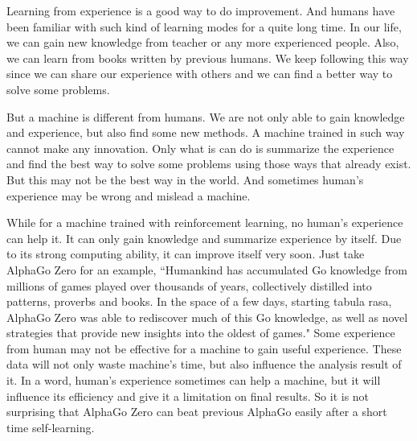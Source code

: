 \documentclass[a4paper,12pt]{article}
\begin{document}
Learning from experience is a good way to do improvement. And humans have been familiar with such kind of learning modes for a quite long time. In our life, we can gain new knowledge from teacher or any more experienced people. Also, we can learn from books written by previous humans. We keep following this way since we can share our experience with others and we can find a better way to solve some problems. 

But a machine is different from humans. We are not only able to gain knowledge and experience, but also find some new methods. A machine trained in such way cannot make any innovation. Only what is can do is summarize the experience and find the best way to solve some problems using those ways that already exist. But this may not be the best way in the world. And sometimes human's experience may be wrong and mislead a machine.

While for a machine trained with reinforcement learning, no human's experience can help it. It can only gain knowledge and summarize experience by itself. Due to its strong computing ability, it can improve itself very soon. Just take AlphaGo Zero for an example, ``Humankind has accumulated Go knowledge from millions of games played over thousands of years, collectively distilled into patterns, proverbs and books. In the space of a few days, starting tabula rasa, AlphaGo Zero was able to rediscover much of this Go knowledge, as well as novel strategies that provide new insights into the oldest of games."\cite{case} Some experience from human may not be effective for a machine to gain useful experience. These data will not only waste machine's time, but also influence the analysis result of it. In a word, human's experience sometimes can help a machine, but it will influence its efficiency and give it a limitation on final results. So it is not surprising that AlphaGo Zero can beat previous AlphaGo easily after a short time self-learning.
\end{document}
